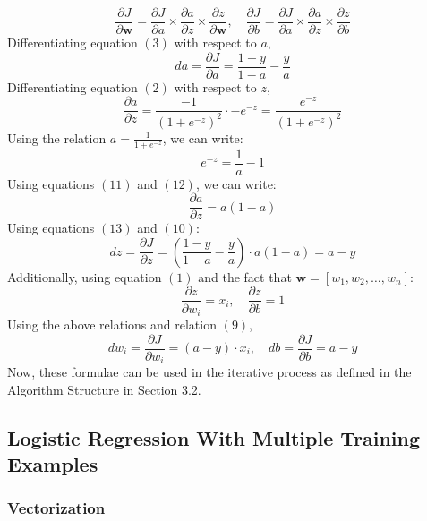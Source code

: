 \documentclass{article}
\begin{document}
\begin{equation}
    \frac{\partial J}{\partial \mathbf{w}}=\frac{\partial J}{\partial a} \times \frac{\partial a}{\partial z} \times \frac{\partial z}{\partial \mathbf{w}}, \quad \frac{\partial J}{\partial b}=\frac{\partial J}{\partial a} \times \frac{\partial a}{\partial z} \times \frac{\partial z}{\partial b}
\end{equation}
Differentiating equation $(3)$ with respect to $a$,
\begin{equation}
    da = \frac{\partial J}{\partial a}=\frac{1-y}{1-a} - \frac{y}{a}
\end{equation}
Differentiating equation $(2)$ with respect to $z$,
\begin{equation}
    \frac{\partial a}{\partial z} = \frac{-1}{(1+e^{-z})^2}\cdot -e^{-z} = \frac{e^{-z}}{(1+e^{-z})^2}
\end{equation}
Using the relation $a = \frac{1}{1 + e^{-z}}$, we can write:
\begin{equation}
    e^{-z} = \frac{1}{a}-1
\end{equation}
Using equations $(11)$ and $(12)$, we can write:
\begin{equation}
    \frac{\partial a}{\partial z} = a(1-a)
\end{equation}
Using equations $(13)$ and $(10)$:
\begin{equation}
    dz = \frac{\partial J}{\partial z}=\left(\frac{1-y}{1-a} - \frac{y}{a}\right)\cdot a(1-a)=a-y
\end{equation}
Additionally, using equation $(1)$ and the fact that $\mathbf{w}=[w_1, w_2, \dots, w_n]$:
$$\frac{\partial z}{\partial w_i}=x_i, \quad \frac{\partial z}{\partial b} = 1$$
Using the above relations and relation $(9)$,
\begin{equation}
    dw_i = \frac{\partial J}{\partial w_i}=(a-y)\cdot x_i, \quad db = \frac{\partial J}{\partial b} = a-y
\end{equation}
Now, these formulae can be used in the iterative process as defined in the Algorithm Structure in Section 3.2.

\subsection{Logistic Regression With Multiple Training Examples}
\subsubsection{Vectorization}
\end{document}
